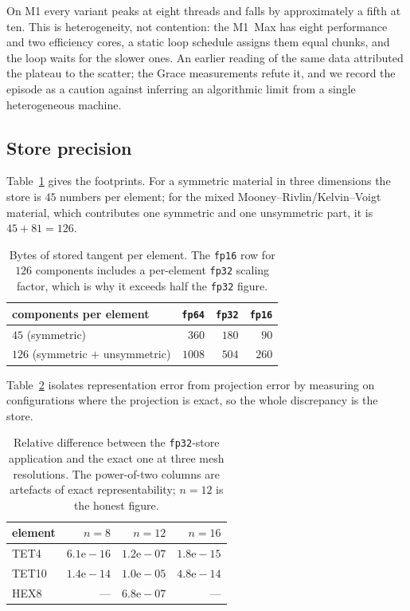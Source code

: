 \documentclass[11pt]{article}
\begin{document}
On M1 every variant peaks at eight threads and falls by approximately a fifth at
ten.  This is heterogeneity, not contention: the M1~Max has eight performance
and two efficiency cores, a static loop schedule assigns them equal chunks, and
the loop waits for the slower ones.  An earlier reading of the same data
attributed the plateau to the scatter; the Grace measurements refute it, and we
record the episode as a caution against inferring an algorithmic limit from a
single heterogeneous machine.

\subsection{Store precision}
\label{sec:precision}

Table~\ref{tab:storage} gives the footprints.  For a symmetric material in three
dimensions the store is $45$ numbers per element; for the mixed
Mooney--Rivlin/Kelvin--Voigt material, which contributes one symmetric and one
unsymmetric part, it is $45+81 = 126$.

\begin{table}[ht]
\centering
\begin{tabular}{lrrr}
\toprule
components per element & \texttt{fp64} & \texttt{fp32} & \texttt{fp16} \\
\midrule
$45$ (symmetric)                  &  $360$ & $180$ &  $90$ \\
$126$ (symmetric $+$ unsymmetric) & $1008$ & $504$ & $260$ \\
\bottomrule
\end{tabular}
\caption{Bytes of stored tangent per element.  The \texttt{fp16} row for $126$
components includes a per-element \texttt{fp32} scaling factor, which is why it
exceeds half the \texttt{fp32} figure.}
\label{tab:storage}
\end{table}

Table~\ref{tab:precision} isolates representation error from projection error by
measuring on configurations where the projection is exact, so the whole
discrepancy is the store.

\begin{table}[ht]
\centering
\begin{tabular}{lrrr}
\toprule
element & $n=8$ & $n=12$ & $n=16$ \\
\midrule
TET4  & $6.1\mathrm{e}{-}16$ & $1.2\mathrm{e}{-}07$ & $1.8\mathrm{e}{-}15$ \\
TET10 & $1.4\mathrm{e}{-}14$ & $1.0\mathrm{e}{-}05$ & $4.8\mathrm{e}{-}14$ \\
HEX8  & ---                  & $6.8\mathrm{e}{-}07$ & ---                  \\
\bottomrule
\end{tabular}
\caption{Relative difference between the \texttt{fp32}-store application and the
exact one at three mesh resolutions.  The power-of-two columns are artefacts of
exact representability; $n=12$ is the honest figure.}
\label{tab:precision}
\end{table}
\end{document}
